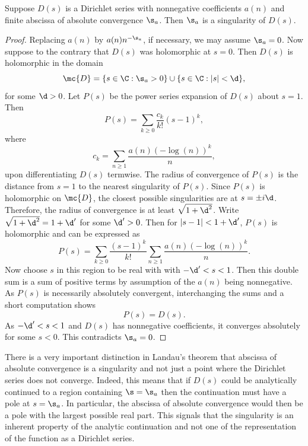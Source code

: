 \documentclass[12pt]{article}
\begin{document}
      \begin{theorem*}
        Suppose \(D(s)\) is a Dirichlet series with nonnegative coefficients \(a(n)\) and finite abscissa of absolute convergence \(\s_{a}\). Then \(\s_{a}\) is a singularity of \(D(s)\).
      \end{theorem*}
      \begin{proof}
        Replacing \(a(n)\) by \(a(n)n^{-\s_{a}}\), if necessary, we may assume \(\s_{a} = 0\). Now suppose to the contrary that \(D(s)\) was holomorphic at \(s = 0\). Then \(D(s)\) is holomorphic in the domain
        \[
          \mc{D} = \{s \in \C:\s_{a} > 0\} \cup \{s \in \C:|s| < \d\},
        \]
        for some \(\d > 0\). Let \(P(s)\) be the power series expansion of \(D(s)\) about \(s = 1\). Then
        \[
          P(s) = \sum_{k \ge 0}\frac{c_{k}}{k!}(s-1)^{k},
        \]
        where
        \[
          c_{k} = \sum_{n \ge 1}\frac{a(n)(-\log(n))^{k}}{n},
        \]
        upon differentiating \(D(s)\) termwise. The radius of convergence of \(P(s)\) is the distance from \(s = 1\) to the nearest singularity of \(P(s)\). Since \(P(s)\) is holomorphic on \(\mc{D}\), the closest possible singularities are at \(s = \pm i\d\). Therefore, the radius of convergence is at least \(\sqrt{1+\d^{2}}\). Write \(\sqrt{1+\d^{2}} = 1+\d'\) for some \(\d' > 0\). Then for \(|s-1| < 1+\d'\), \(P(s)\) is holomorphic and can be expressed as
        \[
          P(s) = \sum_{k \ge 0}\frac{(s-1)^{k}}{k!}\sum_{n \ge 1}\frac{a(n)(-\log(n))^{k}}{n}.
        \]
        Now choose \(s\) in this region to be real with with \(-\d' < s < 1\). Then this double sum is a sum of positive terms by assumption of the \(a(n)\) being nonnegative. As \(P(s)\) is necessarily absolutely convergent, interchanging the sums and a short computation shows
        \[
          P(s) = D(s).
        \]
        As \(-\d' < s < 1\) and \(D(s)\) has nonnegative coefficients, it converges absolutely for some \(s < 0\). This contradicts \(\s_{a} = 0\).
      \end{proof}

      There is a very important distinction in Landau's theorem that abscissa of absolute convergence is a singularity and not just a point where the Dirichlet series does not converge. Indeed, this means that if \(D(s)\) could be analytically continued to a region containing \(\s = \s_{a}\) then the continuation must have a pole at \(s = \s_{a}\). In particular, the abscissa of absolute convergence would then be a pole with the largest possible real part. This signals that the singularity is an inherent property of the analytic continuation and not one of the representation of the function as a Dirichlet series.
\end{document}
